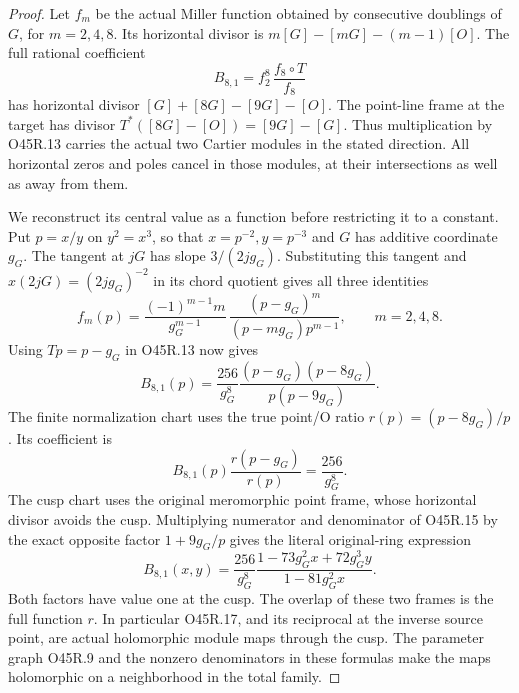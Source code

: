 \begin{proof}
Let \(f_m\) be the actual Miller function obtained
by consecutive doublings of \(G\), for \(m=2,4,8\).
Its horizontal divisor is \(m[G]-[mG]-(m-1)[O]\).
The full rational coefficient
\[
 B_{8,1}=f_2^8\,\frac{f_8\circ T}{f_8}
 \tag{O45R.13}
\]
has horizontal divisor
\([G]+[8G]-[9G]-[O]\). The point-line frame
at the target has divisor \(T^*([8G]-[O])
=[9G]-[G]\). Thus multiplication by O45R.13
carries the actual two Cartier modules in the
stated direction. All horizontal zeros and
poles cancel in those modules, at their
intersections as well as away from them.

We reconstruct its central value as a function
before restricting it to a constant. Put
\(p=x/y\) on \(y^2=x^3\), so that
\(x=p^{-2},y=p^{-3}\) and \(G\) has additive
coordinate \(g_G\). The tangent at \(jG\)
has slope \(3/(2jg_G)\). Substituting this
tangent and \(x(2jG)=(2jg_G)^{-2}\) in its
chord quotient gives all three identities
\[
 f_m(p)=\frac{(-1)^{m-1}m}{g_G^{m-1}}\,
       \frac{(p-g_G)^m}{(p-mg_G)p^{m-1}},
 \qquad m=2,4,8 .
 \tag{O45R.14}
\]
Using \(Tp=p-g_G\) in O45R.13 now gives
\[
 B_{8,1}(p)=\frac{256}{g_G^8}
       \frac{(p-g_G)(p-8g_G)}{p(p-9g_G)}.
 \tag{O45R.15}
\]
The finite normalization chart uses the true
point/O ratio \(r(p)=(p-8g_G)/p\).
Its coefficient is
\[
 B_{8,1}(p)\frac{r(p-g_G)}{r(p)}
       =\frac{256}{g_G^8}.
 \tag{O45R.16}
\]
The cusp chart uses the original meromorphic
point frame, whose horizontal divisor avoids
the cusp. Multiplying numerator and denominator
of O45R.15 by the exact opposite factor
\(1+9g_G/p\) gives the literal original-ring expression
\[
 B_{8,1}(x,y)=\frac{256}{g_G^8}
       \frac{1-73g_G^2x+72g_G^3y}
            {1-81g_G^2x}.
 \tag{O45R.17}
\]
Both factors have value one at the cusp.
The overlap of these two frames is the full
function \(r\). In particular O45R.17, and
its reciprocal at the inverse source point,
are actual holomorphic module maps through
the cusp. The parameter graph O45R.9 and the
nonzero denominators in these formulas make
the maps holomorphic on a neighborhood in
the total family.


\end{proof}
